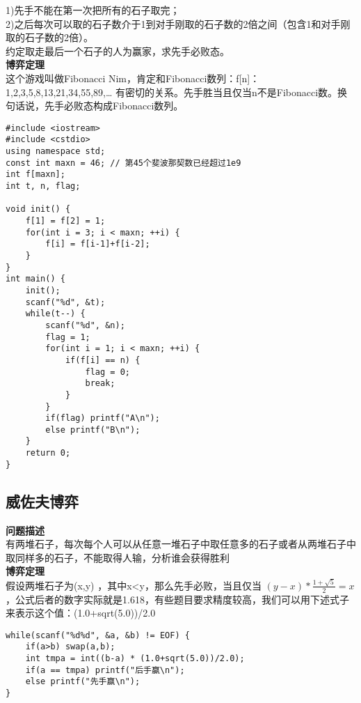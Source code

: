 1)先手不能在第一次把所有的石子取完；
\\

2)之后每次可以取的石子数介于1到对手刚取的石子数的2倍之间（包含1和对手刚取的石子数的2倍）。
\\

约定取走最后一个石子的人为赢家，求先手必败态。
\\

\textbf{博弈定理}\\

这个游戏叫做Fibonacci Nim，肯定和Fibonacci数列：f[n]：1,2,3,5,8,13,21,34,55,89,… 有密切的关系。先手胜当且仅当n不是Fibonacci数。换句话说，先手必败态构成Fibonacci数列。\\

\begin{lstlisting}
#include <iostream>
#include <cstdio>
using namespace std;
const int maxn = 46; // 第45个斐波那契数已经超过1e9 
int f[maxn];
int t, n, flag;

void init() {
	f[1] = f[2] = 1;
	for(int i = 3; i < maxn; ++i) {
		f[i] = f[i-1]+f[i-2];
	}
}
int main() {
	init();
	scanf("%d", &t);
	while(t--) {
		scanf("%d", &n);
		flag = 1;
		for(int i = 1; i < maxn; ++i) {
			if(f[i] == n) {
				flag = 0;
				break;
			}
		}
		if(flag) printf("A\n");
		else printf("B\n");
	}
	return 0;
}
\end{lstlisting}

\subsection{威佐夫博弈}
\textbf{问题描述}\\
有两堆石子，每次每个人可以从任意一堆石子中取任意多的石子或者从两堆石子中取同样多的石子，不能取得人输，分析谁会获得胜利\\
\textbf{博弈定理}\\
假设两堆石子为(x,y) ，其中x<y，那么先手必败，当且仅当 $ (y-x) * \frac{1+\sqrt{5}}{2} = x $ ，公式后者的数字实际就是1.618，有些题目要求精度较高，我们可以用下述式子来表示这个值：(1.0+sqrt(5.0))/2.0\\
\begin{lstlisting}
while(scanf("%d%d", &a, &b) != EOF) {
	if(a>b) swap(a,b);
	int tmpa = int((b-a) * (1.0+sqrt(5.0))/2.0);
	if(a == tmpa) printf("后手赢\n");
	else printf("先手赢\n");
}
\end{lstlisting}

